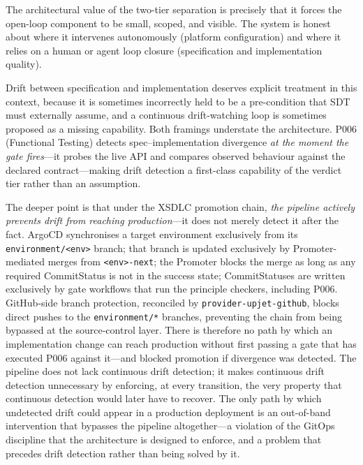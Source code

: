The architectural value of the two-tier separation is precisely that it forces the open-loop component to be small, scoped, and visible. The system is honest about where it intervenes autonomously (platform configuration) and where it relies on a human or agent loop closure (specification and implementation quality).

Drift between specification and implementation deserves explicit treatment in this context, because it is sometimes incorrectly held to be a pre-condition that SDT must externally assume, and a continuous drift-watching loop is sometimes proposed as a missing capability. Both framings understate the architecture. P006 (Functional Testing) detects spec--implementation divergence \textit{at the moment the gate fires}---it probes the live API and compares observed behaviour against the declared contract---making drift detection a first-class capability of the verdict tier rather than an assumption.

The deeper point is that under the XSDLC promotion chain, \textit{the pipeline actively prevents drift from reaching production}---it does not merely detect it after the fact. ArgoCD synchronises a target environment exclusively from its \texttt{environment/<env>} branch; that branch is updated exclusively by Promoter-mediated merges from \texttt{<env>-next}; the Promoter blocks the merge as long as any required CommitStatus is not in the success state; CommitStatuses are written exclusively by gate workflows that run the principle checkers, including P006. GitHub-side branch protection, reconciled by \texttt{provider-upjet-github}, blocks direct pushes to the \texttt{environment/*} branches, preventing the chain from being bypassed at the source-control layer. There is therefore no path by which an implementation change can reach production without first passing a gate that has executed P006 against it---and blocked promotion if divergence was detected. The pipeline does not lack continuous drift detection; it makes continuous drift detection unnecessary by enforcing, at every transition, the very property that continuous detection would later have to recover. The only path by which undetected drift could appear in a production deployment is an out-of-band intervention that bypasses the pipeline altogether---a violation of the GitOps discipline that the architecture is designed to enforce, and a problem that precedes drift detection rather than being solved by it.

